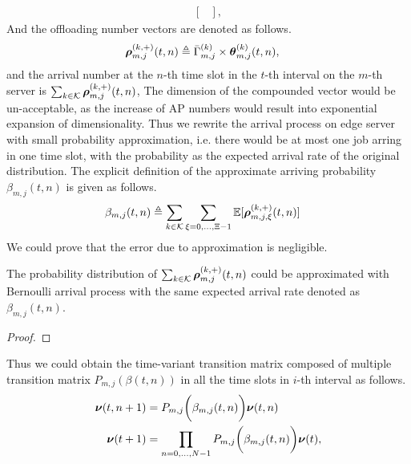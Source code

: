 {\begin{align}
\begin{bmatrix}
        \end{bmatrix},
    \end{align}
    And the offloading number vectors are denoted as follows.
    \begin{align}
        \boldsymbol{\rho}^{(k,+)}_{m,j}({t,n}) &\triangleq \bar{\Gamma}^{(k)}_{m,j} \times \boldsymbol{\theta}^{(k)}_{m,j}({t,n}),
    \end{align}
    and the arrival number at the $n$-th time slot in the $t$-th interval on the $m$-th server is $\sum_{k\in\mathcal{K}} \boldsymbol{\rho}^{(k,+)}_{m,j}({t,n})$,
    The dimension of the compounded vector would be un-acceptable, as the increase of AP numbers would result into exponential expansion of dimensionality.
    Thus we rewrite the arrival process on edge server with small probability approximation, i.e. there would be at most one job arring in one time slot, with the probability as the expected arrival rate of the original distribution. The explicit definition of the approximate arriving probability $\beta_{m,j}({t,n})$ is given as follows.
    \begin{align}
        {\beta}_{m,j}({t,n}) &\triangleq \sum_{k\in\mathcal{K}} \sum_{\xi=0,\dots,\Xi-1} \mathbb{E}[\boldsymbol{\rho}^{(k,+)}_{m,j,\xi}({t,n})]
        \label{eqn_0}
    \end{align}
    We could prove that the error due to approximation is negligible.
    \begin{lemma}
        The probability distribution of $\sum_{k\in\mathcal{K}} \boldsymbol{\rho}^{(k,+)}_{m,j}({t,n})$ could be approximated with Bernoulli arrival process with the same expected arrival rate denoted as ${\beta}_{m,j}({t,n})$.
    \end{lemma}
    \begin{proof}
    \end{proof}

    Thus we could obtain the time-variant transition matrix composed of multiple transition matrix $P_{m,j}(\beta({t,n}))$ in all the time slots in $i$-th interval as follows.
    \begin{align}
        \boldsymbol{\nu}({t,n+1}) &= P_{m,j}\bigg(\beta_{m,j}({t,n})\bigg) \boldsymbol{\nu}({t,n})
        \\
        \boldsymbol{\nu}(t+1) &= \prod_{n=0,\dots,N-1} P_{m,j}\bigg(\beta_{m,j}({t,n})\bigg) \boldsymbol{\nu}(t),
        \label{eqn_4}
    \end{align}

}
